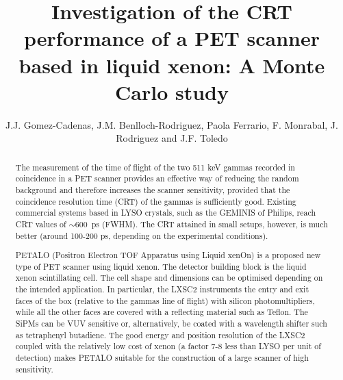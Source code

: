 \documentclass[review]{elsarticle}
\begin{document}
\begin{frontmatter}

\title{Investigation of the CRT performance of a PET scanner based in liquid xenon: A Monte Carlo study}


\author{J.J. Gomez-Cadenas, J.M. Benlloch-Rodriguez, Paola Ferrario, F. Monrabal, J. Rodriguez and J.F. Toledo}
\address{IFIC (U. Valencia/CSIC)}

%
%

\begin{abstract}
The measurement of the time of flight of the two 511 keV gammas recorded in coincidence in a PET scanner provides an effective way of reducing the random background and therefore increases the scanner sensitivity, provided that the coincidence resolution time (CRT) of the gammas is sufficiently good. Existing commercial systems based in LYSO crystals, such as the GEMINIS of Philips, reach CRT values of 
$\sim 600$~ps (FWHM). The CRT attained in small setups, however, is much better (around 100-200 ps, depending on the experimental conditions). 

PETALO (Positron Electron TOF Apparatus using Liquid xenOn) is a proposed new type of PET scanner using liquid xenon. The detector building block is the liquid xenon scintillating cell. The cell shape and dimensions can be optimised depending on the intended application. In particular, the LXSC2 instruments the entry and exit faces of the box (relative to the gammas line of flight) with silicon photomultipliers, while all the other faces are covered with a reflecting material such as Teflon. The SiPMs can be VUV sensitive or, alternatively, be coated with a wavelength shifter such as tetraphenyl butadiene. The good energy and position resolution of the LXSC2 coupled with the relatively low cost of xenon (a factor 7-8 less than LYSO per unit of detection) makes PETALO suitable for the construction of a large scanner of high sensitivity.   


\end{abstract}
\end{frontmatter}
\end{document}
